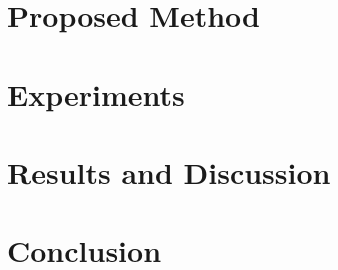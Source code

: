 \documentclass[twocolumn]{svjour3}
\begin{document}
\section{Proposed Method}\label{sec:method}

\section{Experiments}\label{sec:experiments}

\section{Results and Discussion}\label{sec:results}

\section{Conclusion}\label{sec:conclusion}




\begingroup
\raggedright

\endgroup
\end{document}
